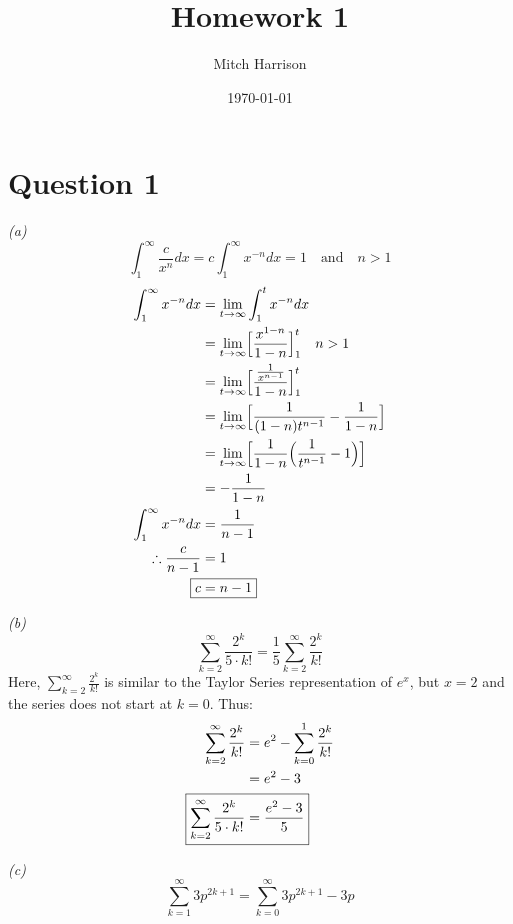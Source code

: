 \documentclass[titlepage, 12pt, leqno]{article}
\title{\Huge{Homework 1}}
\author{\large{Mitch Harrison}}
\date{\today}
\newcommand{\bigbracket}[1]{\Bigl [ #1 \Bigr ]}
\newcommand{\bigparen}[1]{\Bigl ( #1 \Bigr )}
\begin{document}
\setlength{\parskip}{1\baselineskip}
\setlength{\parindent}{15pt}
\setlength{\jot}{10pt}
\maketitle
\newpage


\section{Question 1}
\textit{(a)} 
\[
    \int_{1}^{\infty} \frac{c}{x^n}dx = c \int_{1}^{\infty} x^{-n}dx = 1 \quad \text{and} 
    \quad n > 1
\]
\begin{align*}
    \int_{1}^{\infty}x^{-n}dx &= \lim_{t \to \infty} \int_{1}^{t} x^{-n}dx \\
    &= \lim_{t \to \infty} \bigbracket{\frac{x^{1-n}}{1-n}}_1^t \quad n > 1 \\
    &= \lim_{t \to \infty} \bigbracket{\frac{\frac{1}{x^{n-1}}}{1-n}}_1^t \\
    &= \lim_{t \to \infty} \bigbracket{\frac{1}{(1-n)t^{n-1}} - \frac{1}{1-n}} \\
    &= \lim_{t \to \infty} \bigbracket{\frac{1}{1-n}\bigparen{\frac{1}{t^{n-1}} - 1}} \\
    &= -\frac{1}{1-n} \\
    \int_{1}^{\infty}x^{-n}dx &= \frac{1}{n-1} \\
    \therefore \frac{c}{n-1} &= 1 \\
    \Aboxed{c &= n-1}
\end{align*}

\pagebreak
\textit{(b)} 
\[
    \sum_{k=2}^{\infty}\frac{2^k}{5\cdot k!} =\frac{1}{5}\sum_{k=2}^{\infty}\frac{2^k}{k!}
\]
Here, $\sum_{k=2}^{\infty}\frac{2^k}{k!}$ is similar to the Taylor Series representation of $e^x$, but $x = 2$ and the series does not start at $k=0$. Thus:
\begin{align*}
    \sum_{k=2}^{\infty}\frac{2^k}{k!} &= e^{2} - \sum_{k=0}^{1}\frac{2^k}{k!} \\
    &= e^{2} - 3 \\
    \Aboxed{\sum_{k=2}^{\infty}\frac{2^k}{5 \cdot k!} &= \frac{e^{2} - 3}{5}}
\end{align*}

\textit{(c)} 
\[
    \sum_{k=1}^{\infty}3p^{2k+1} = \sum_{k=0}^{\infty}3p^{2k+1}-3p
\]
\end{document}
